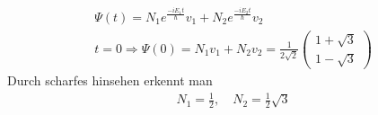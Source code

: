 \documentclass{scrartcl}
\newcommand{\vecz}[2]{\begin{pmatrix}#1 \\ #2\end{pmatrix}}
\begin{document}
\begin{enumerate}[a)]
\begin{align*}
\Psi(t) = N_1e^\frac{-iE_1t}{\hbar}v_1 + N_2e^\frac{-iE_2t}{\hbar}v_2\\
t = 0 \Rightarrow \Psi(0) = N_1v_1 + N_2v_2 = \frac{1}{2 \sqrt{2}} \vecz {1+\sqrt{3}}{1-\sqrt{3}}
\end{align*}
Durch scharfes hinsehen erkennt man
\begin{align*}
N_1 = \frac{1}{2}, \quad N_2 = \frac{1}{2}\sqrt{3}
\end{align*}

\end{enumerate}
\end{document}
